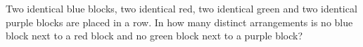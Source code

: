 Two identical blue blocks, two identical red, two identical green and two identical purple blocks are placed in a row. In how many distinct arrangements is no blue block next to a red block and no green block next to a purple block?

